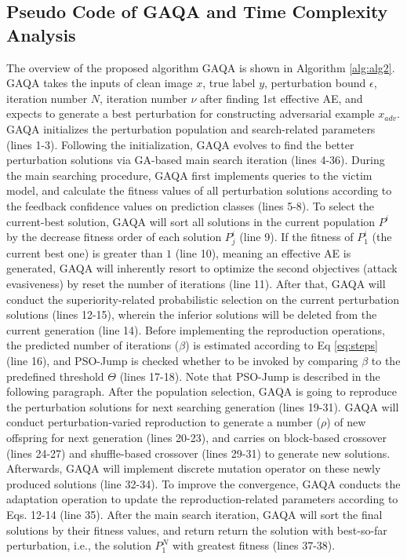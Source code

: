 \documentclass[lettersize,journal]{IEEEtran}
\begin{document}
	\subsection{Pseudo Code of GAQA and Time Complexity Analysis}
	The overview of the proposed algorithm GAQA is shown in Algorithm \ref{alg:alg2}. GAQA takes the inputs of clean image $x$, true label $y$, perturbation bound $\epsilon$, iteration number $N$, iteration number $\nu$ after finding 1st effective AE, and expects to generate a best perturbation for constructing adversarial example $x_{adv}$. GAQA initializes the perturbation population and search-related parameters (lines 1-3). Following the initialization, GAQA evolves to find the better perturbation solutions via GA-based main search iteration (lines 4-36). During the main searching procedure, GAQA first implements queries to the victim model, and calculate the fitness values of all perturbation solutions according to the feedback confidence values on prediction classes (lines 5-8). To select the current-best solution, GAQA will sort all solutions in the current population $P^i$ by the decrease fitness order of each solution $P^i_j$ (line 9). If the fitness of $P^i_1$ (the current best one) is greater than $1$ (line 10), meaning an effective AE is generated, GAQA will inherently resort to optimize the second objectives (attack evasiveness) by reset the number of iterations (line 11). After that, GAQA will conduct the superiority-related probabilistic selection on the current perturbation solutions (lines 12-15), wherein the inferior solutions will be deleted from the current generation (line 14). Before implementing the reproduction operations, the predicted number of iterations ($\beta$) is estimated according to Eq \ref{eq:steps} (line 16), and PSO-Jump is checked whether to be invoked by comparing $\beta$ to the predefined threshold $\Theta$ (lines 17-18). Note that PSO-Jump is described in the following paragraph. After the population selection, GAQA is going to reproduce the perturbation solutions for next searching generation (lines 19-31). GAQA will conduct perturbation-varied reproduction to generate a number ($\rho$) of new offspring for next generation (lines 20-23), and carries on block-based crossover (lines 24-27) and shuffle-based crossover (lines 29-31) to generate new solutions. Afterwards, GAQA will implement discrete mutation operator on these newly produced solutions (line 32-34). To improve the convergence, GAQA conducts the adaptation operation to update the reproduction-related parameters according to Eqs. 12-14 (line 35). After the main search iteration, GAQA will sort the final solutions by their fitness values, and return return the solution with best-so-far perturbation, i.e., the solution $P^N_1$ with greatest fitness (lines 37-38).
	
\end{document}
